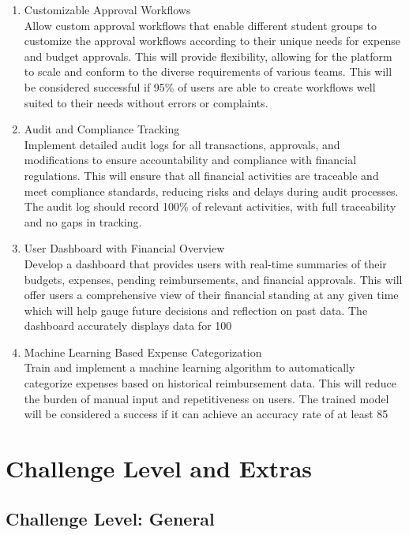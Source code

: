 \documentclass{article}
\begin{document}
\begin{enumerate}
    \item Customizable Approval Workflows \\
    Allow custom approval workflows that enable different student groups to customize the approval workflows according to their unique needs for expense and budget approvals. This will provide flexibility, allowing for the platform to scale and conform to the diverse requirements of various teams. This will be considered successful if 95\% of users are able to create workflows well suited to their needs without errors or complaints.
    \item Audit and Compliance Tracking \\
    Implement detailed audit logs for all transactions, approvals, and modifications to ensure accountability and compliance with financial regulations. This will ensure that all financial activities are traceable and meet compliance standards, reducing risks and delays during audit processes. The audit log should record 100\% of relevant activities, with full traceability and no gaps in tracking.
    \item User Dashboard with Financial Overview \\
    Develop a dashboard that provides users with real-time summaries of their budgets, expenses, pending reimbursements, and financial approvals. This will offer users a comprehensive view of their financial standing at any given time which will help gauge future decisions and reflection on past data. The dashboard accurately displays data for 100%
    \item Machine Learning Based Expense Categorization \\
    Train and implement a machine learning algorithm to automatically categorize expenses based on historical reimbursement data. This will reduce the burden of manual input and repetitiveness on users. The trained model will be considered a success if it can achieve an accuracy rate of at least 85%
\end{enumerate}

\section{Challenge Level and Extras}
\subsection{Challenge Level: General}
\end{document}
